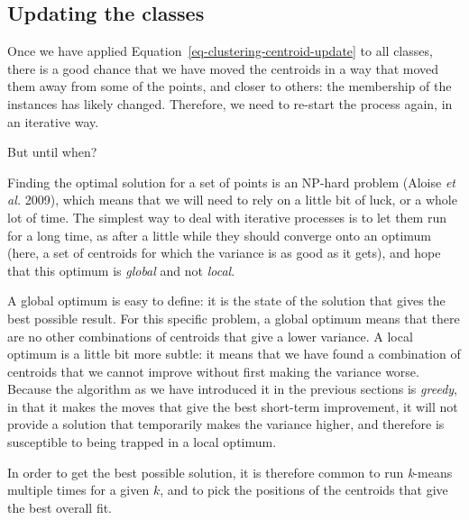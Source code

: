 \documentclass[
  letterpaper,
]{scrbook}
\begin{document}
\subsection{Updating the classes}\label{updating-the-classes}


Once we have applied Equation~\ref{eq-clustering-centroid-update} to all
classes, there is a good chance that we have moved the centroids in a
way that moved them away from some of the points, and closer to others:
the membership of the instances has likely changed. Therefore, we need
to re-start the process again, in an iterative way.

But until when?

Finding the optimal solution for a set of points is an NP-hard problem
(Aloise \emph{et al.} 2009), which means that we will need to rely on a
little bit of luck, or a whole lot of time. The simplest way to deal
with iterative processes is to let them run for a long time, as after a
little while they should converge onto an optimum (here, a set of
centroids for which the variance is as good as it gets), and hope that
this optimum is \emph{global} and not \emph{local}.

A global optimum is easy to define: it is the state of the solution that
gives the best possible result. For this specific problem, a global
optimum means that there are no other combinations of centroids that
give a lower variance. A local optimum is a little bit more subtle: it
means that we have found a combination of centroids that we cannot
improve without first making the variance worse. Because the algorithm
as we have introduced it in the previous sections is \emph{greedy}, in
that it makes the moves that give the best short-term improvement, it
will not provide a solution that temporarily makes the variance higher,
and therefore is susceptible to being trapped in a local optimum.

In order to get the best possible solution, it is therefore common to
run \emph{k}-means multiple times for a given \(k\), and to pick the
positions of the centroids that give the best overall fit.
\end{document}
